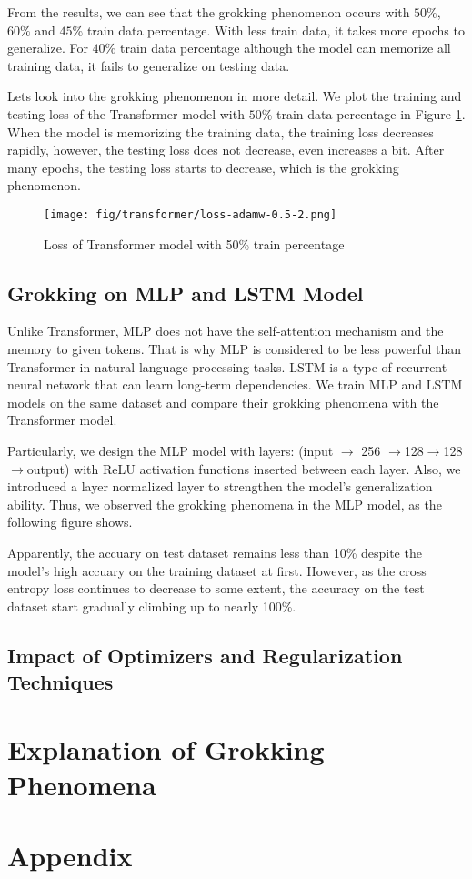\documentclass{article}
\begin{document}
From the results, we can see that the grokking phenomenon occurs with $50\%$, $60\%$ and $45\%$ train data percentage. With less train data, it takes more epochs to generalize. For $40\%$ train data percentage although the model can memorize all training data, it fails to generalize on testing data.

Lets look into the grokking phenomenon in more detail. We plot the training and testing loss of the Transformer model with $50\%$ train data percentage in Figure \ref{fig:transformer-loss}. When the model is memorizing the training data, the training loss decreases rapidly, however, the testing loss does not decrease, even increases a bit. After many epochs, the testing loss starts to decrease, which is the grokking phenomenon.

\begin{figure}[ht]
    \centering
    \texttt{[image: fig/transformer/loss-adamw-0.5-2.png]}
    \caption{Loss of Transformer model with 50\% train percentage}
    \label{fig:transformer-loss}
\end{figure}

\subsection{Grokking on MLP and LSTM Model}

Unlike Transformer, MLP does not have the self-attention mechanism and the memory to given tokens. That is why MLP is considered to be less powerful than Transformer in natural language processing tasks. LSTM is a type of recurrent neural network that can learn long-term dependencies. We train MLP and LSTM models on the same dataset and compare their grokking phenomena with the Transformer model.

Particularly, we design the MLP model with layers: (input $\rightarrow$ 256 $\rightarrow $128$ \rightarrow $128$ \rightarrow $output) with ReLU activation functions inserted between each layer. Also, we introduced a layer normalized layer to strengthen the model's generalization ability. Thus, we observed the grokking phenomena in the MLP model, as the following figure shows.


Apparently, the accuary on test dataset remains less than 10\% despite the model's high accuary on the training dataset at first. However, as the cross entropy loss continues to decrease to some extent, the accuracy on the test dataset start gradually climbing up to nearly 100\%.

\subsection{Impact of Optimizers and Regularization Techniques}

\section{Explanation of Grokking Phenomena}

\appendix

\section{Appendix}
\end{document}
